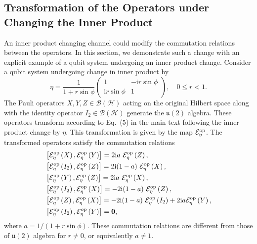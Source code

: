 \documentclass[amsmath,amssymb,aps,pra,superscriptaddress,twocolumn]{revtex4-2}
\begin{document}
\begin{appendix}
\section{Transformation of the Operators under Changing the Inner Product}\label{sec:commutation}
An inner product changing channel could modify the 
commutation relations between the operators. 
In this section, we demonstrate such a change
with an explicit example of a qubit system undergoing an inner product change.
Consider a qubit system undergoing change in inner product by
\begin{equation}
    \eta = \frac{1}{1 + r\sin\phi} \begin{pmatrix}
1 & -\text{i}r\sin\phi \\
\text{i}r\sin\phi & 1
 \end{pmatrix}, \quad 0\le r<1.
\end{equation}
The Pauli operators $X,Y,Z \in \mathcal{B}(\mathscr{H})$ acting on the original
Hilbert space along with the identity operator $I_2\in \mathcal{B}(\mathscr{H})$ generate the $\mathfrak{u}(2)$
algebra.
These operators transform according to Eq.~(5) in the main text
following the inner product change by $\eta$.
This transformation is given by the map $\mathcal{E}^{\rm op}_\eta$.
The transformed operators satisfy the commutation relations
\begin{align}
    &\left[\mathcal{E}^{\rm op}_\eta\left(X\right),\mathcal{E}^{\rm op}_\eta\left(Y\right)\right] =  2\text{i}a\ \mathcal{E}^{\rm op}_\eta\left(Z\right),\nonumber \\ 
    &\left[ \mathcal{E}^{\rm op}_\eta\left(I_2\right), \mathcal{E}^{\rm op}_\eta\left(Z\right) \right] = 2\text{i}(1-a)\  \mathcal{E}^{\rm op}_\eta\left(X\right), \nonumber \\ 
    & \left[\mathcal{E}^{\rm op}_\eta\left(Y\right),\mathcal{E}^{\rm op}_\eta\left(Z\right)\right] =  2\text{i}a\ \mathcal{E}^{\rm op}_\eta\left(X\right),\nonumber \\ 
    &\left[ \mathcal{E}^{\rm op}_\eta\left(I_2\right), \mathcal{E}^{\rm op}_\eta\left(X\right) \right] = -2\text{i}(1-a)\ \mathcal{E}^{\rm op}_\eta\left(Z\right), 
    \nonumber \\
    &\left[\mathcal{E}^{\rm op}_\eta\left(Z\right),\mathcal{E}^{\rm op}_\eta\left(X\right)\right] =  -2\text{i}(1-a)\ \mathcal{E}^{\rm op}_\eta\left(I_2\right)+2\text{i}a\mathcal{E}^{\rm op}_\eta\left(Y\right),\nonumber \\ 
    &\left[\mathcal{E}^{\rm op}_\eta\left(I_2\right),\mathcal{E}^{\rm op}_\eta\left(Y\right)\right] = \bm{0},
\end{align}
where $a = 1/(1+r\sin \phi)$. These commutation relations are different from 
those of $\mathfrak{u}(2)$ algebra for $r \ne 0$, or equivalently $a \ne 1$.



\end{appendix}
\end{document}
